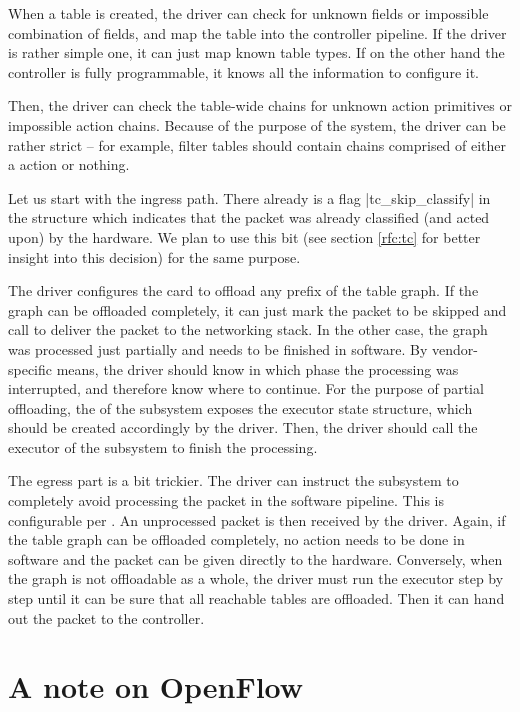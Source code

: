 When a table is created, the driver can check for unknown fields or impossible
combination of fields, and map the table into the controller pipeline. If the
driver is rather simple one, it can just map known table types. If on the other
hand the controller is fully programmable, it knows all the information to
configure it.

Then, the driver can check the table-wide chains for unknown action primitives or
impossible action chains. Because of the purpose of the system, the driver can
be rather strict -- for example, filter tables should contain chains comprised
of either a  action or nothing.

Let us start with the ingress path. There already is a flag
\field|tc_skip_classify| in the \skb{} structure which indicates that
the packet was already classified (and acted upon) by the hardware. We plan to
use this bit (see section \ref{rfc:tc} for better insight into this decision)
for the same purpose.

The driver configures the card to offload any prefix of the table graph. If the
graph can be offloaded completely, it can just mark the packet to be skipped and
call  to deliver the packet to the networking stack. In the other case,
the graph was processed just partially and needs to be finished in software. By
vendor-specific means, the driver should know in which phase the processing was
interrupted, and therefore know where to continue. For the purpose of partial
offloading, the  of the subsystem exposes the executor state
structure, which should be created accordingly by the driver. Then, the driver
should call the executor of the subsystem to finish the processing.

The egress part is a bit trickier. The driver can instruct the subsystem to
completely avoid processing the packet in the software pipeline. This is
configurable per \netdev. An unprocessed packet is then received by the
driver. Again, if the table graph can be offloaded completely, no action needs
to be done in software and the packet can be given directly to the hardware.
Conversely, when the graph is not offloadable as a whole, the driver must
run the executor step by step until it can be sure that all reachable tables are
offloaded. Then it can hand out the packet to the controller.

\section{A note on OpenFlow}

